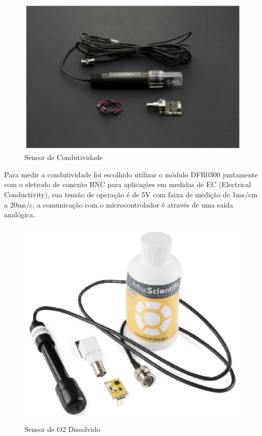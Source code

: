 \begin{figure}[H]
 \centering
   \includegraphics[keepaspectratio=true,scale=0.8]{figuras/sensorcodutividade.eps}
 \caption{Sensor de Condutividade}
 \label{sensor_condutividade}
\end{figure}

Para medir a condutividade foi escolhido utilizar o módulo DFR0300 juntamente com o eletrodo de conexão BNC para aplicações em medidas de EC (Electrical Conductivity), sua tensão de operação é de 5V com faixa de medição de 1ms/cm a 20ms/c, a comunicação com o microcontrolador é através de uma saída analógica.


\begin{figure}[H]
 \centering
   \includegraphics[keepaspectratio=true,scale=0.8]{figuras/sesoro2.eps}
 \caption{Sensor de O2 Dissolvido}
 \label{sensor_o2}
\end{figure}

